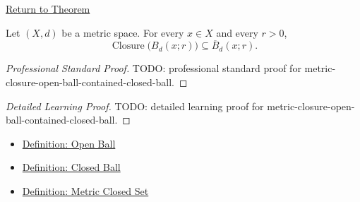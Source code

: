 \newpage
{}
\label{prf:metric-closure-open-ball-contained-closed-ball}

\begin{remark*}[Return]
\hyperref[thm:metric-closure-open-ball-contained-closed-ball]{Return to Theorem}
\end{remark*}

\begin{theorem*}
Let \((X,d)\) be a metric space.  For every \(x\in X\) and every \(r>0\),
\[
  \operatorname{Closure}\bigl(B_d(x;r)\bigr)\subseteq \overline{B}_d(x;r).
\]
\end{theorem*}

\begin{proof}[Professional Standard Proof]
\LRAProofBodyStart
TODO: professional standard proof for metric-closure-open-ball-contained-closed-ball.
\end{proof}

\begin{proof}[Detailed Learning Proof]
\LRAProofBodyStart
TODO: detailed learning proof for metric-closure-open-ball-contained-closed-ball.
\end{proof}

\begin{remark*}
\end{remark*}

\begin{dependencies}
\begin{itemize}
  \item \hyperref[def:metric-open-ball]{Definition: Open Ball}
  \item \hyperref[def:metric-closed-ball]{Definition: Closed Ball}
  \item \hyperref[def:metric-closed-set]{Definition: Metric Closed Set}
\end{itemize}
\end{dependencies}

\clearpage
